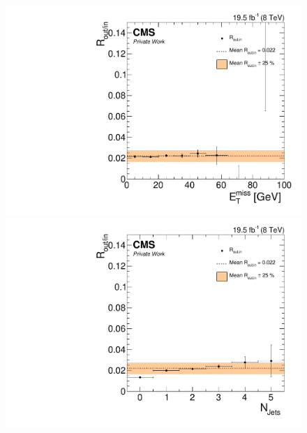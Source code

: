 \begin{figure}[htbp]
\centering
\begin{minipage}[t]{0.49\textwidth}
  \includegraphics[width=\textwidth]{plots/BG/rOutIn/rOutInSyst_DrellYanControlCentral_Full2012_MET_HighMass_SF_None.pdf}
\end{minipage}
\begin{minipage}[t]{0.49\textwidth}
\includegraphics[width=\textwidth]{plots/BG/rOutIn/rOutInSyst_DrellYanControlCentral_Full2012_NJets_HighMass_SF_None.pdf}
\end{minipage}
\begin{minipage}[t]{0.49\textwidth}

\end{minipage}
\end{figure}
